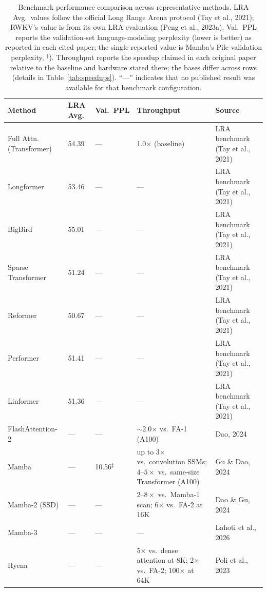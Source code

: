 \documentclass[10pt,twocolumn]{article}
\newif\ifshrinkfloats
\newcommand{\sflt}[2]{\ifshrinkfloats#1\else#2\fi}
\begin{document}
\begin{table}[!tbp]
\centering
\sflt{\fontsize{8.5}{10.2}\selectfont}{\footnotesize}
\renewcommand{\arraystretch}{\sflt{1.2}{1.4}}
\caption{Benchmark performance comparison across representative methods. LRA Avg.\ values follow the official Long Range Arena protocol (Tay et al., 2021); RWKV's value is from its own LRA evaluation (Peng et al., 2023a). Val.\ PPL reports the validation-set language-modeling perplexity (lower is better) as reported in each cited paper; the single reported value is Mamba's Pile validation perplexity, $^\ddagger$). Throughput reports the speedup claimed in each original paper relative to the baseline and hardware stated there; the bases differ across rows (details in Table~\ref{tab:speedups}). ``---'' indicates that no published result was available for that benchmark configuration.}
\label{tab:benchmarks}
\setlength{\tabcolsep}{3pt}%
\begin{tabular}{p{2.1cm}p{1.4cm}p{1.5cm}p{3.4cm}p{1.8cm}}
\toprule
Method & LRA Avg. & Val.\ PPL & Throughput & Source \\
\midrule
Full Attn. (Transformer) & 54.39 & --- & 1.0$\times$ (baseline) & LRA benchmark (Tay et al., 2021) \\
Longformer & 53.46 & --- & --- & LRA benchmark (Tay et al., 2021) \\
BigBird & 55.01 & --- & --- & LRA benchmark (Tay et al., 2021) \\
Sparse Transformer & 51.24 & --- & --- & LRA benchmark (Tay et al., 2021) \\
Reformer & 50.67 & --- & --- & LRA benchmark (Tay et al., 2021) \\
Performer & 51.41 & --- & --- & LRA benchmark (Tay et al., 2021) \\
Linformer & 51.36 & --- & --- & LRA benchmark (Tay et al., 2021) \\
FlashAttention-2 & --- & --- & $\sim$2.0$\times$ vs.\ FA-1 (A100) & Dao, 2024 \\
Mamba & --- & 10.56$^\ddagger$ & up to 3$\times$ vs.\ convolution SSMs; $4$--$5\times$ vs.\ same-size Transformer (A100) & Gu \& Dao, 2024 \\
Mamba-2 (SSD) & --- & --- & $2$--$8\times$ vs.\ Mamba-1 scan; 6$\times$ vs.\ FA-2 at 16K & Dao \& Gu, 2024 \\
Mamba-3 & --- & --- & --- & Lahoti et al., 2026 \\
Hyena & --- & --- & 5$\times$ vs.\ dense attention at 8K; 2$\times$ vs.\ FA-2; 100$\times$ at 64K & Poli et al., 2023 \\

\end{tabular}
\end{table}
\end{document}
